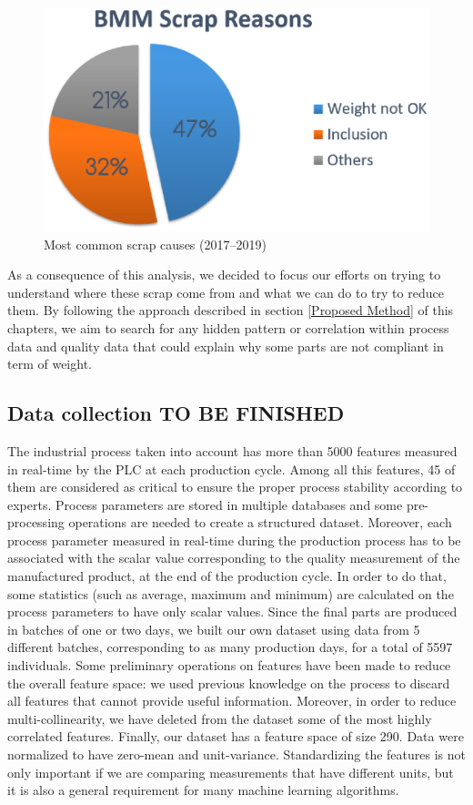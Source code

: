 \begin{figure}
\centerline{\includegraphics[scale=0.9]{images/chapter_3/Scraps_codes.eps}}
\caption{Most common scrap causes (2017--2019)}
\label{fig:Most common scrap causes (2017-2018-2019)}
\end{figure}

As a consequence of this analysis, we decided to focus our efforts on trying to understand where these scrap come from and what we can do to try to reduce them. By following the approach described in section \ref{Proposed Method} of this chapters, we aim to search for any hidden pattern or correlation within process data and quality data that could explain why some parts are not compliant in term of weight.


\subsection{Data collection TO BE FINISHED}

The industrial process taken into account has more than 5000 features measured in real-time by the PLC at each production cycle. Among all this features, 45 of them are considered as critical to ensure the proper process stability according to experts. Process parameters are stored in multiple databases and some pre-processing operations are needed to create a structured dataset.  Moreover, each process parameter measured in real-time during the production process has to be associated with the scalar value corresponding to the quality measurement of the manufactured product, at the end of the production cycle. In order to do that, some statistics (such as average, maximum and minimum) are calculated on the process parameters to have only scalar values.
Since the final parts are produced in batches of one or two days, we built our own dataset using data from 5 different batches, corresponding to as many production days, for a total of 5597 individuals. Some preliminary operations on features have been made to reduce the overall feature space: we used previous knowledge on the process to discard all features that cannot provide useful information. Moreover, in order to reduce multi-collinearity, we have deleted from the dataset some of the most highly correlated features. Finally, our dataset has a feature space of size 290. Data were normalized to have zero-mean and unit-variance. Standardizing the features is not only important if we are comparing measurements that have different units, but it is also a general requirement for many machine learning algorithms. 

